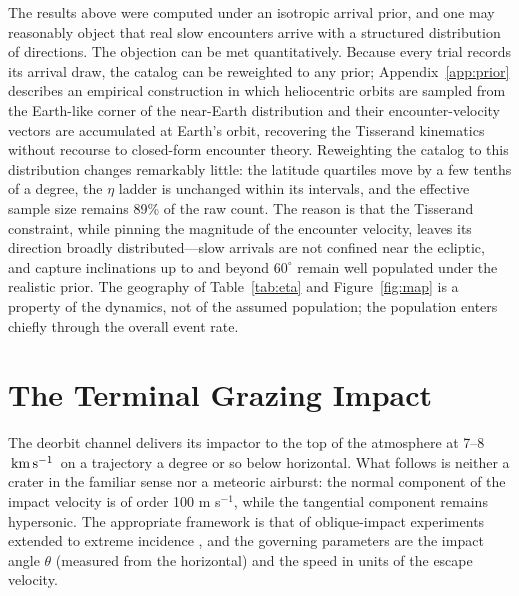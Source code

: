 \documentclass[twocolumn]{aastex701}
\newcommand{\kms}{\ensuremath{{\rm \,km\,s^{-1}}}}
\begin{document}
The results above were computed under an isotropic arrival prior, and one
may reasonably object that real slow encounters arrive with a structured
distribution of directions. The objection can be met quantitatively.
Because every trial records its arrival draw, the catalog can be
reweighted to any prior; Appendix~\ref{app:prior} describes an empirical
construction in which heliocentric orbits are sampled from the Earth-like
corner of the near-Earth distribution and their encounter-velocity vectors
are accumulated at Earth's orbit, recovering the Tisserand kinematics
without recourse to closed-form encounter theory. Reweighting the catalog
to this distribution changes remarkably little: the latitude quartiles
move by a few tenths of a degree, the $\eta$ ladder is unchanged within
its intervals, and the effective sample size remains 89\% of the raw
count. The reason is that the Tisserand constraint, while pinning the
magnitude of the encounter velocity, leaves its direction broadly
distributed---slow arrivals are not confined near the ecliptic, and
capture inclinations up to and beyond $60^{\circ}$ remain well populated
under the realistic prior. The geography of Table~\ref{tab:eta} and
Figure~\ref{fig:map} is a property of the dynamics, not of the assumed
population; the population enters chiefly through the overall event rate.

\section{The Terminal Grazing Impact} \label{sec:terminal}

The deorbit channel delivers its impactor to the top of the atmosphere at
7--8 \kms\ on a trajectory a degree or so below horizontal. What follows
is neither a crater in the familiar sense nor a meteoric airburst: the
normal component of the impact velocity is of order 100 m s$^{-1}$, while
the tangential component remains hypersonic. The appropriate framework
is that of oblique-impact experiments extended to extreme incidence
\citep{gaultwedekind1978, schultzgault1990}, and the governing parameters
are the impact angle $\theta$ (measured from the horizontal) and the
speed in units of the escape velocity.
\end{document}
